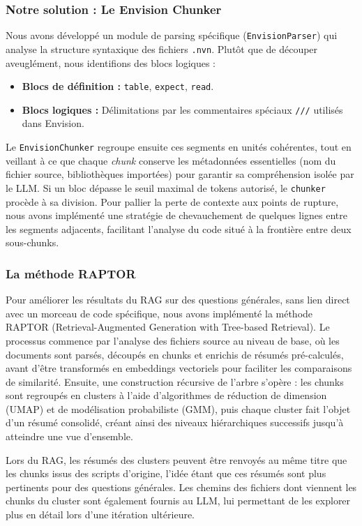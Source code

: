 \subsubsection{Notre solution : Le Envision Chunker}
Nous avons développé un module de parsing spécifique (\texttt{EnvisionParser}) qui analyse la structure syntaxique des fichiers \texttt{.nvn}. Plutôt que de découper aveuglément, nous identifions des blocs logiques :
\begin{itemize}
    \item \textbf{Blocs de définition :} \texttt{table}, \texttt{expect}, \texttt{read}.
    \item \textbf{Blocs logiques :} Délimitations par les commentaires spéciaux \texttt{///} utilisés dans Envision.
\end{itemize}
Le \texttt{EnvisionChunker} regroupe ensuite ces segments en unités cohérentes, tout en veillant à ce que chaque \textit{chunk} conserve les métadonnées essentielles (nom du fichier source, bibliothèques importées) pour garantir sa compréhension isolée par le LLM. Si un bloc dépasse le seuil maximal de tokens autorisé, le \texttt{chunker} procède à sa division. Pour pallier la perte de contexte aux points de rupture, nous avons implémenté une stratégie de chevauchement de quelques lignes entre les segments adjacents, facilitant l'analyse du code situé à la frontière entre deux sous-chunks.

\subsubsection{La méthode RAPTOR}
Pour améliorer les résultats du RAG sur des questions générales, sans lien direct avec un morceau de code spécifique, nous avons implémenté la méthode RAPTOR (Retrieval-Augmented Generation with Tree-based Retrieval). Le processus commence par l'analyse des fichiers source au niveau de base, où les documents sont parsés, découpés en chunks et enrichis de résumés pré-calculés, avant d'être transformés en embeddings vectoriels pour faciliter les comparaisons de similarité. Ensuite, une construction récursive de l'arbre s'opère : les chunks sont regroupés en clusters à l'aide d'algorithmes de réduction de dimension (UMAP) et de modélisation probabiliste (GMM), puis chaque cluster fait l'objet d'un résumé consolidé, créant ainsi des niveaux hiérarchiques successifs jusqu'à atteindre une vue d'ensemble.

Lors du RAG, les résumés des clusters peuvent être renvoyés au même titre que les chunks issus des scripts d'origine, l'idée étant que ces résumés sont plus pertinents pour des questions générales. Les chemins des fichiers dont viennent les chunks du cluster sont également fournis au LLM, lui permettant de les explorer plus en détail lors d'une itération ultérieure.


